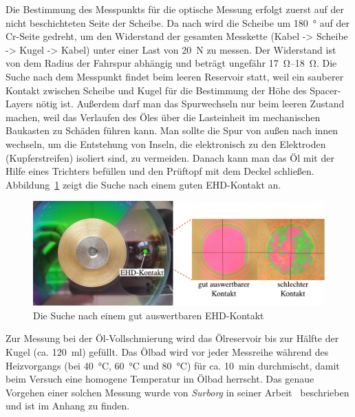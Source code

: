 Die Bestimmung des Messpunkts für die optische Messung erfolgt zuerst auf der nicht beschichteten Seite der Scheibe.
Da nach wird die Scheibe um \SI{180}{\degree} auf der Cr-Seite gedreht, um den Widerstand der gesamten Messkette (Kabel -> Scheibe -> Kugel -> Kabel) unter einer Last von \SI{20}{\newton} zu messen.
Der Widerstand ist von dem Radius der Fahrspur abhängig und beträgt ungefähr \SIrange{17}{18}{\ohm}.
Die Suche nach dem Messpunkt findet beim leeren Reservoir statt, weil ein sauberer Kontakt zwischen Scheibe und Kugel für die Bestimmung der Höhe des Spacer-Layers nötig ist.
Außerdem darf man das Spurwechseln nur beim leeren Zustand machen, weil das Verlaufen des Öles über die Lasteinheit im mechanischen Baukasten zu Schäden führen kann.
Man sollte die Spur von außen nach innen wechseln, um die Entstehung von Inseln, die elektronisch zu den Elektroden (Kupferstreifen) isoliert sind, zu vermeiden.
Danach kann man das Öl mit der Hilfe eines Trichters befüllen und den Prüftopf mit dem Deckel schließen.
Abbildung~\ref{fig:suche_nach_ehd_kontakt} zeigt die Suche nach einem guten EHD-Kontakt an.

\begin{figure}[htb]
    \centering
    \includegraphics[]{./images/suche_nach_ehd_kontakt.pdf}
    \caption{Die Suche nach einem gut auswertbaren EHD-Kontakt}
    \label{fig:suche_nach_ehd_kontakt}
\end{figure}

Zur Messung bei der Öl-Vollschmierung wird das Ölreservoir bis zur Hälfte der Kugel (ca. \SI{120}{\ml}) gefüllt.
Das Ölbad wird vor jeder Messreihe während des Heizvorgangs (bei \SI{40}{\degreeCelsius}, \SI{60}{\degreeCelsius} und \SI{80}{\degreeCelsius}) für ca. \SI{10}{\minute} durchmischt, damit beim Versuch eine homogene Temperatur im Ölbad herrscht.
Das genaue Vorgehen einer solchen Messung wurde von \textit{Surborg} in seiner Arbeit~\cite{surborg_2007} beschrieben und ist im Anhang zu finden.

